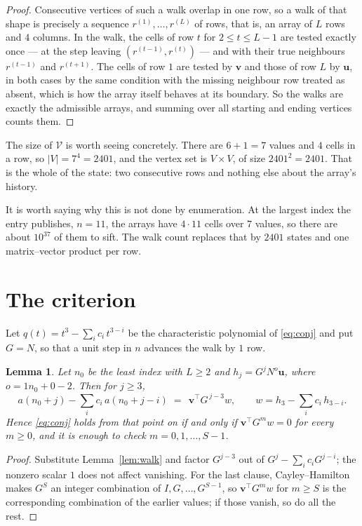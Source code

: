\documentclass[11pt,a4paper]{article}
\theoremstyle{plain}
\newtheorem{lemma}[theorem]{Lemma}
\theoremstyle{definition}
\begin{document}
\begin{proof}
Consecutive vertices of such a walk overlap in one row, so a walk of that shape is
precisely a sequence $r^{(1)},\dots,r^{(L)}$ of rows, that is, an array of $L$ rows
and $4$ columns. In the walk, the cells of row $t$ for $2\le t\le L-1$ are tested
exactly once --- at the step leaving $(r^{(t-1)},r^{(t)})$ --- and with their true
neighbours $r^{(t-1)}$ and $r^{(t+1)}$. The cells of row $1$ are tested by
$\mathbf{v}$ and those of row $L$ by $\mathbf{u}$, in both cases by the same condition
with the missing neighbour row treated as absent, which is how the array itself behaves at
its boundary. So the walks are exactly the admissible arrays, and summing over all starting
and ending vertices counts them.
\end{proof}


The size of $\mathcal V$ is worth seeing concretely. There are $6+1=7$ values
and $4$ cells in a row, so $|V|=7^{4}=2401$, and the vertex set is
$V\times V$, of size $2401^2=2401$. That is the whole of the state: two consecutive
rows and nothing else about the array's history.

It is worth saying why this is not done by enumeration. At the largest index the entry
publishes, $n=11$, the arrays have $4\cdot11$ cells over
$7$ values, so there are about $10^{37}$ of them to sift. The
walk count replaces that by $2401$ states and one matrix--vector product per row.
\section{The criterion}

Let $q(t)=t^{3}-\sum_i c_i\,t^{3-i}$ be the characteristic polynomial of
\eqref{eq:conj} and put $G=N$, so that a unit step in $n$ advances the walk by
$1$ row.

\begin{lemma}\label{lem:crit}
Let $n_0$ be the least index with $L\ge2$ and $h_j=G^{j}N^{o}\mathbf{u}$, where
$o=1n_0+0-2$. Then for $j\ge3$,
\[
a(n_0+j)-\sum_i c_i\,a(n_0+j-i)\;=\;\,\mathbf{v}^{\!\top}G^{\,j-3}w,
\qquad w=h_{3}-\sum_i c_i\,h_{3-i} .
\]
Hence \eqref{eq:conj} holds from that point on if and only if
$\mathbf{v}^{\!\top}G^{m}w=0$ for every $m\ge0$, and it is enough to check
$m=0,1,\dots,S-1$.
\end{lemma}

\begin{proof}
Substitute Lemma~\ref{lem:walk} and factor $G^{j-3}$ out of
$G^{j}-\sum_ic_iG^{j-i}$; the nonzero scalar $1$ does not affect
vanishing. For the last clause, Cayley--Hamilton makes $G^{S}$ an integer combination of
$I,G,\dots,G^{S-1}$, so $\mathbf{v}^{\!\top}G^{m}w$ for $m\ge S$ is the corresponding
combination of the earlier values; if those vanish, so do all the rest.
\end{proof}
\end{document}
